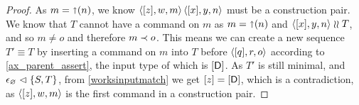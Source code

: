 \begin{proof}
As $m=\mathord{\shortuparrow}(n)$, we know $\langle{[z],w,m}\rangle\,\langle{[x],y,n}\rangle$ must be a construction pair.
We know that $T$ cannot have a command on $m$ as $m=\mathord{\shortuparrow}(n)$ and $\langle{[x],y,n}\rangle\mathrel{\wr\wr} T$,
and so $m\neq o$ and therefore $m\prec o$.
This means we can create a new sequence $T'\equiv T$ by inserting a command on 
$m$ into $T$ before $\langle{[q],r,o}\rangle$
according to \cref{ax_parent_assert}, the input type of which is $[\mathsf{D}]$.
As $T'$ is still minimal, and ${\epsilon_\varnothing}\vartriangleleft{\{{S,T}\}}$,
from \cref{worksinputmatch} we get $[z]=[\mathsf{D}]$, which is a contradiction,
as $\langle{[z],w,m}\rangle$ is the first command in a construction pair.
\end{proof}

